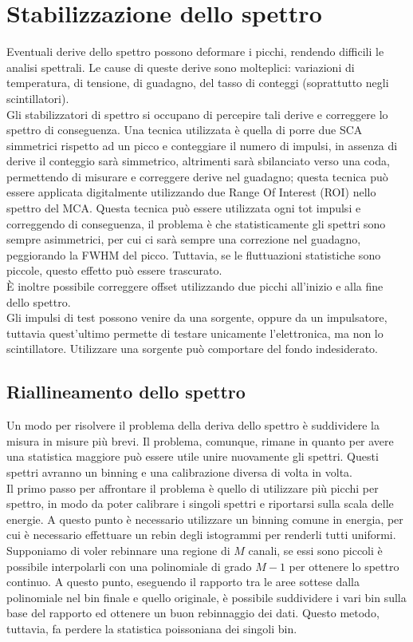 \section{Stabilizzazione dello spettro}
Eventuali derive dello spettro possono deformare i picchi, rendendo difficili le analisi spettrali.
Le cause di queste derive sono molteplici: variazioni di temperatura, di tensione, di guadagno, del tasso di conteggi (soprattutto negli scintillatori).\\
Gli stabilizzatori di spettro si occupano di percepire tali derive e correggere lo spettro di conseguenza. 
Una tecnica utilizzata \`e quella di porre due SCA simmetrici rispetto ad un picco e conteggiare il numero di impulsi, in assenza di derive il conteggio
sar\`a simmetrico, altrimenti sar\`a sbilanciato verso una coda, permettendo di misurare e correggere derive nel guadagno;
questa tecnica pu\`o essere applicata digitalmente utilizzando due Range Of Interest (ROI) nello spettro del MCA.
Questa tecnica pu\`o essere utilizzata ogni tot impulsi e correggendo di conseguenza, il problema \`e che statisticamente gli spettri sono sempre asimmetrici,
per cui ci sar\`a sempre una correzione nel guadagno, peggiorando la FWHM del picco. 
Tuttavia, se le fluttuazioni statistiche sono piccole, questo effetto pu\`o essere trascurato.\\
\`E inoltre possibile correggere offset utilizzando due picchi all'inizio e alla fine dello spettro.\\
Gli impulsi di test possono venire da una sorgente, oppure da un impulsatore, tuttavia quest'ultimo permette di testare unicamente l'elettronica, ma non lo scintillatore.
Utilizzare una sorgente pu\`o comportare del fondo indesiderato.
\subsection{Riallineamento dello spettro}
Un modo per risolvere il problema della deriva dello spettro \`e suddividere la misura in misure pi\`u brevi.
Il problema, comunque, rimane in quanto per avere una statistica maggiore pu\`o essere utile unire nuovamente gli spettri.
Questi spettri avranno un binning e una calibrazione diversa di volta in volta.\\
Il primo passo per affrontare il problema \`e quello di utilizzare pi\`u picchi per spettro, in modo da poter calibrare i singoli spettri e riportarsi sulla scala delle energie.
A questo punto \`e necessario utilizzare un binning comune in energia, per cui \`e necessario effettuare un rebin degli istogrammi per renderli tutti uniformi.\\
Supponiamo di voler rebinnare una regione di $M$ canali, se essi sono piccoli \`e possibile interpolarli con una polinomiale di grado $M-1$ per ottenere lo spettro continuo.
A questo punto, eseguendo il rapporto tra le aree sottese dalla polinomiale nel bin finale e quello originale, \`e possibile suddividere i vari bin sulla base del rapporto ed ottenere un buon rebinnaggio dei dati.
Questo metodo, tuttavia, fa perdere la statistica poissoniana dei singoli bin.
